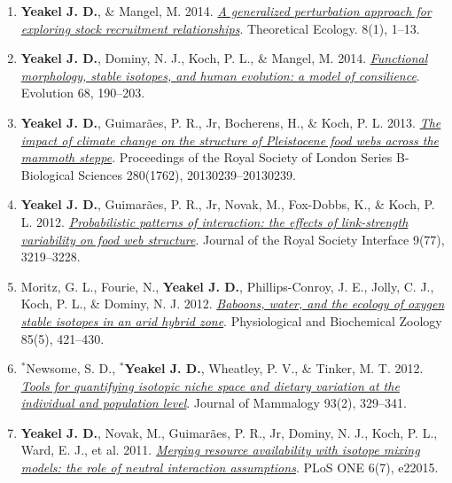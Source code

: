 \documentclass[margin,line,12pt]{res}
\begin{document}
\begin{resume}
\begin{enumerate}
\item \textbf{Yeakel J. D.}, \& Mangel, M. 2014. \href{https://link.springer.com/article/10.1007/s12080-014-0230-z}{\emph{A generalized perturbation approach for exploring stock recruitment relationships}}. Theoretical Ecology. 8(1), 1–13.

\item \textbf{Yeakel J. D.}, Dominy, N. J., Koch, P. L., \& Mangel, M. 2014. \href{https://onlinelibrary.wiley.com/doi/full/10.1111/evo.12240}{\emph{Functional morphology, stable isotopes, and human evolution: a model of consilience}}. Evolution 68, 190–203.

\item \textbf{Yeakel J. D.}, Guimar\~aes, P. R., Jr, Bocherens, H., \& Koch, P. L. 2013. \href{https://royalsocietypublishing.org/doi/10.1098/rspb.2013.0239}{\emph{The impact of climate change on the structure of Pleistocene food webs across the mammoth steppe}}. Proceedings of the Royal Society of London Series B-Biological Sciences 280(1762), 20130239–20130239.

\item \textbf{Yeakel J. D.}, Guimar\~aes, P. R., Jr, Novak, M., Fox-Dobbs, K., \& Koch, P. L. 2012. \href{https://royalsocietypublishing.org/doi/10.1098/rsif.2012.0481}{\emph{Probabilistic patterns of interaction: the effects of link-strength variability on food web structure}}. Journal of the Royal Society Interface 9(77), 3219–3228.

\item Moritz, G. L., Fourie, N., \textbf{Yeakel J. D.}, Phillips-Conroy, J. E., Jolly, C. J., Koch, P. L., \& Dominy, N. J. 2012. \href{https://pubmed.ncbi.nlm.nih.gov/22902370/}{\emph{Baboons, water, and the ecology of oxygen stable isotopes in an arid hybrid zone}}. Physiological and Biochemical Zoology 85(5), 421–430.

\item ${}^\ast$Newsome, S. D., \textbf{${}^\ast$Yeakel J. D.}, Wheatley, P. V., \& Tinker, M. T. 2012. \href{https://academic.oup.com/jmammal/article/93/2/329/919625}{\emph{Tools for quantifying isotopic niche space and dietary variation at the individual and population level}}. Journal of Mammalogy 93(2), 329–341.

\item \textbf{Yeakel J. D.}, Novak, M., Guimar\~aes, P. R., Jr, Dominy, N. J., Koch, P. L., Ward, E. J., et al. 2011. \href{https://journals.plos.org/plosone/article?id=10.1371/journal.pone.0022015}{\emph{Merging resource availability with isotope mixing models: the role of neutral interaction assumptions}}. PLoS ONE 6(7), e22015.


\end{enumerate}
\end{resume}
\end{document}
